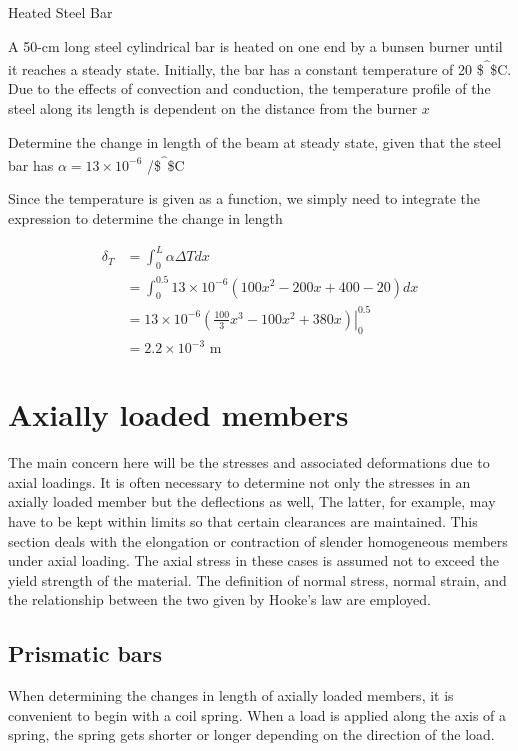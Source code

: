 \documentclass[a4paper,openany,12pt]{book}
\begin{document}
Heated Steel Bar

A 50-cm long steel cylindrical bar is heated on one end by a bunsen
burner until it reaches a steady state. Initially, the bar has a
constant temperature of 20 \$\textsuperscript{\^{}}\$C. Due to the effects of convection
and conduction, the temperature profile of the steel along its length is
dependent on the distance from the burner \(x\)


Determine the change in length of the beam at steady state, given that
the steel bar has \(\alpha = 13 \times 10^{-6}\) /\$\textsuperscript{\^{}}\$C

Since the temperature is given as a function, we simply need to
integrate the expression to determine the change in length

$$\begin{aligned}
    \delta_T &= \int_0^L \alpha \Delta T dx \\
             &= \int_0^{0.5} 13 \times 10^{-6} (100x^2 - 200x + 400 - 20) dx \\
             &= 13 \times 10^{-6} \left. \left( \frac{100}{3} x^3 - 100 x^2 + 380 x \right) \right|_0^{0.5} \\
             &= 2.2 \times 10^{-3} \text{ m}
  \end{aligned}$$

\section{Axially loaded members}
\label{axially-loaded-members}
The main concern here will be the stresses and associated deformations
due to axial loadings. It is often necessary to determine not only the
stresses in an axially loaded member but the deflections as well, The
latter, for example, may have to be kept within limits so that certain
clearances are maintained. This section deals with the elongation or
contraction of slender homogeneous members under axial loading. The
axial stress in these cases is assumed not to exceed the yield strength
of the material. The definition of normal stress, normal strain, and the
relationship between the two given by Hooke's law are employed.

\subsection{Prismatic bars}
\label{prismatic-bars}
When determining the changes in length of axially loaded members, it is
convenient to begin with a coil spring. When a load is applied along the
axis of a spring, the spring gets shorter or longer depending on the
direction of the load.
\end{document}
